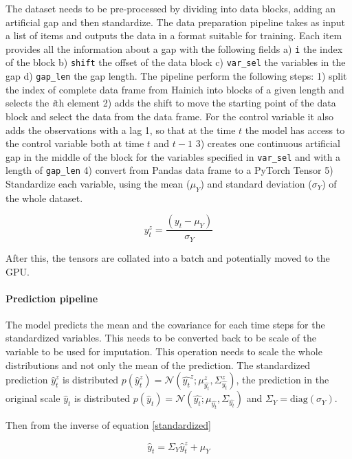 \documentclass{article}
\newcommand{\norm}[3]{\mathcal{N}\left(#1; #2, #3\right)} %
\begin{document}
The dataset needs to be pre-processed by dividing into data blocks, adding an artificial gap and then standardize. The data preparation pipeline takes as input a list of items and outputs the data in a format suitable for training. Each item provides all the information about a gap with the following fields a) \verb|i| the index of the block b) \verb|shift|  the offset of the data block c) \verb|var_sel| the variables in the gap d) \verb|gap_len| the gap length. The pipeline perform the following steps: 1) split the index of complete data frame from Hainich into blocks of a given length and selects the \textit{i}th element  2) adds the shift to move the starting point of the data block and select the data from the data frame. For the control variable it also adds the observations with a lag 1, so that at the time $t$ the model has access to the control variable both at time $t$ and $t-1$ 3) creates one continuous artificial gap in the middle of the block for the variables specified in \verb|var_sel| and with a length of \verb|gap_len| 4) convert from Pandas data frame to a PyTorch Tensor 5) Standardize each variable, using the mean ($\mu_Y$) and standard deviation ($\sigma_Y$) of the whole dataset.

\begin{equation}\label{standardized}
    y^z_t = \frac{(y_t - \mu_Y)}{\sigma_Y}
\end{equation}

After this, the tensors are collated into a batch and potentially moved to the GPU.

\paragraph{Prediction pipeline}

The model predicts the mean and the covariance for each time steps for the standardized variables. This needs to be converted back to be scale of the variable to be used for imputation. This operation needs to scale the whole distributions and not only the mean of the prediction. The standardized prediction $\hat{y}^z_t$ is distributed $p(\hat{y}^z_t) = \norm{\hat{y_t}^z}{\mu^z_{\hat{y_t}}}{\Sigma^z_{\hat{y_t}}}$, the prediction in the original scale $\hat{y}_t$ is distributed $p(\hat{y}_t) =  \norm{\hat{y_t}}{\mu_{\hat{y_t}}}{\Sigma_{\hat{y_t}}}$ and $\Sigma_Y = \text{diag}(\sigma_Y)$. 

Then from the inverse of equation \ref{standardized}

\begin{equation}
    \hat{y}_t = \Sigma_Y\hat{y}^z_t + \mu_Y
\end{equation}
\end{document}
